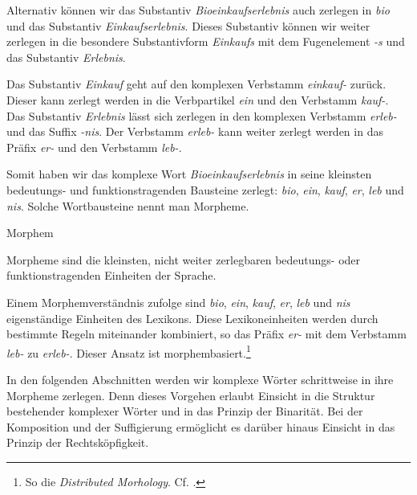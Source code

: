Alternativ können wir das Substantiv \textit{Bioeinkaufserlebnis} auch zerlegen in \textit{bio} und das Substantiv \textit{Einkaufserlebnis}. Dieses Substantiv können wir weiter zerlegen in die besondere Substantivform \textit{Einkaufs} mit dem Fugenelement \textit{-s} und das Substantiv \textit{Erlebnis}.

Das Substantiv \textit{Einkauf} geht auf den komplexen Verbstamm \textit{einkauf-} zurück. Dieser kann zerlegt werden in die Verbpartikel \textit{ein} und den Verbstamm \textit{kauf-}. Das Substantiv \textit{Erlebnis} lässt sich zerlegen in den komplexen Verbstamm \textit{erleb-} und das Suffix \textit{-nis}. Der Verbstamm \textit{erleb-} kann weiter zerlegt werden in das Präfix \textit{er-} und den Verbstamm \textit{leb-}.

Somit haben wir das komplexe Wort \textit{Bioeinkaufserlebnis} in seine kleinsten bedeutungs- und funktionstragenden Bausteine zerlegt: \textit{bio}, \textit{ein}, \textit{kauf}, \textit{er}, \textit{leb} und \textit{nis}. Solche Wortbausteine nennt man Morpheme.

\begin{Definition}{Morphem}\label{def:Morphem}
    
\noindent Morpheme sind die kleinsten, nicht weiter zerlegbaren bedeutungs- oder funktionstragenden Einheiten der Sprache. 
\end{Definition}



Einem Morphemverständnis zufolge sind \textit{bio}, \textit{ein}, \textit{kauf}, \textit{er}, \textit{leb} und \textit{nis} eigenständige Einheiten des Lexikons. Diese Lexikoneinheiten werden durch bestimmte Regeln miteinander kombiniert, so \zB das Präfix \textit{er-} mit dem Verbstamm \textit{leb-} zu \textit{erleb-}. Dieser Ansatz ist morphembasiert.\footnote{So \zB die \textit{Distributed Morhology}. Cf. \citet{HarleyNoyer1999}.}

In den folgenden Abschnitten werden wir komplexe Wörter schrittweise in ihre Morpheme zerlegen. Denn dieses Vorgehen erlaubt Einsicht in die Struktur bestehender komplexer Wörter und in das Prinzip der Binarität. Bei der Komposition und der Suffigierung ermöglicht es darüber hinaus Einsicht in das Prinzip der Rechtsköpfigkeit.

